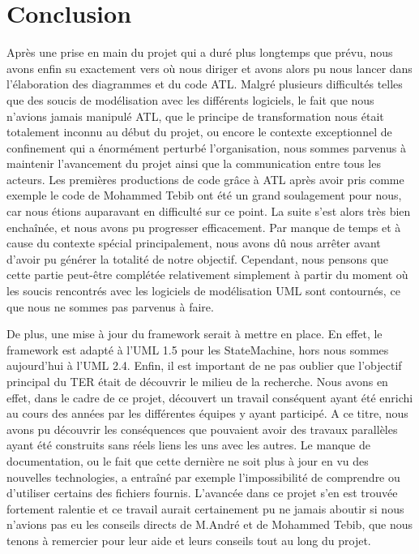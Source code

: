 \documentclass[french, 12pt, a4paper]{article}
\begin{document}
\section{Conclusion}
Après une prise en main du projet qui a duré plus longtemps que prévu, nous avons enfin su exactement vers où nous diriger et avons alors pu nous lancer dans l'élaboration des diagrammes et du code ATL. Malgré plusieurs difficultés telles que des soucis de modélisation avec les différents logiciels, le fait que nous n'avions jamais manipulé ATL, que le principe de transformation nous était totalement inconnu au début du projet, ou encore le contexte exceptionnel de confinement qui a énormément perturbé l'organisation, nous sommes parvenus à maintenir l'avancement du projet ainsi que la communication entre tous les acteurs. Les premières productions de code grâce à ATL après avoir pris comme exemple le code de Mohammed Tebib ont été un grand soulagement pour nous, car nous étions auparavant en difficulté sur ce point. La suite s'est alors très bien enchaînée, et nous avons pu progresser efficacement. 
\newline
\newline
Par manque de temps et à cause du contexte spécial principalement, nous avons dû nous arrêter avant d'avoir pu générer la totalité de notre objectif. Cependant, nous pensons que cette partie peut-être complétée relativement simplement à partir du moment où les soucis rencontrés avec les logiciels de modélisation UML sont contournés, ce que nous ne sommes pas parvenus à faire.

De plus, une mise à jour du framework serait à mettre en place. En effet, le framework est adapté à l'UML 1.5 pour les StateMachine, hors nous sommes aujourd'hui à l'UML 2.4.
\newline
\newline
Enfin, il est important de ne pas oublier que l'objectif principal du TER était de découvrir le milieu de la recherche. Nous avons en effet, dans le cadre de ce projet, découvert un travail conséquent ayant été enrichi au cours des années par les différentes équipes y ayant participé. A ce titre, nous avons pu découvrir les conséquences que pouvaient avoir des travaux parallèles ayant été construits sans réels liens les uns avec les autres. Le manque de documentation, ou le fait que cette dernière ne soit plus à jour en vu des nouvelles technologies, a entraîné par exemple l'impossibilité de comprendre ou d'utiliser certains des fichiers fournis. L'avancée dans ce projet s'en est trouvée fortement ralentie et ce travail aurait certainement pu ne jamais aboutir si nous n'avions pas eu les conseils directs de M.André et de Mohammed Tebib, que nous tenons à remercier pour leur aide et leurs conseils tout au long du projet.
\end{document}

